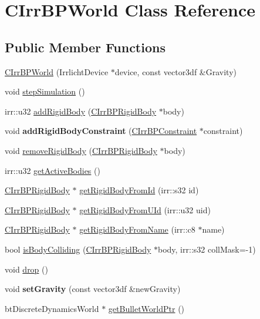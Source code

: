 \hypertarget{class_c_irr_b_p_world}{
\section{CIrrBPWorld Class Reference}
\label{class_c_irr_b_p_world}
}
\subsection*{Public Member Functions}
\begin{DoxyCompactItemize}
\item 
\hyperlink{class_c_irr_b_p_world_a585d92e41db74a19bf1cb982ddc0cddc}{CIrrBPWorld} (IrrlichtDevice $\ast$device, const vector3df \&Gravity)
\item 
void \hyperlink{class_c_irr_b_p_world_aa676e88466f927af2ac0c4c8cd94e0f3}{stepSimulation} ()
\item 
irr::u32 \hyperlink{class_c_irr_b_p_world_a0bf527c522426b50d959ab5adc27be4c}{addRigidBody} (\hyperlink{class_c_irr_b_p_rigid_body}{CIrrBPRigidBody} $\ast$body)
\item 
\hypertarget{class_c_irr_b_p_world_a7565f787e92f3c3cf76da072fe175b11}{
void {\bfseries addRigidBodyConstraint} (\hyperlink{class_c_irr_b_p_constraint}{CIrrBPConstraint} $\ast$constraint)}
\label{class_c_irr_b_p_world_a7565f787e92f3c3cf76da072fe175b11}

\item 
void \hyperlink{class_c_irr_b_p_world_a7133c6b9763ac425ac579cdfbda8788b}{removeRigidBody} (\hyperlink{class_c_irr_b_p_rigid_body}{CIrrBPRigidBody} $\ast$body)
\item 
irr::u32 \hyperlink{class_c_irr_b_p_world_a66e4c4aeef5d3ae6f907753860b8fd5a}{getActiveBodies} ()
\item 
\hyperlink{class_c_irr_b_p_rigid_body}{CIrrBPRigidBody} $\ast$ \hyperlink{class_c_irr_b_p_world_a7ebeb8e75b825a493daa1cea6d07aa21}{getRigidBodyFromId} (irr::s32 id)
\item 
\hyperlink{class_c_irr_b_p_rigid_body}{CIrrBPRigidBody} $\ast$ \hyperlink{class_c_irr_b_p_world_a1b96effdaad31a6e05185f2b683a0445}{getRigidBodyFromUId} (irr::u32 uid)
\item 
\hyperlink{class_c_irr_b_p_rigid_body}{CIrrBPRigidBody} $\ast$ \hyperlink{class_c_irr_b_p_world_a1ed94585fa44f0ab99cfa4a1fdc29fcd}{getRigidBodyFromName} (irr::c8 $\ast$name)
\item 
bool \hyperlink{class_c_irr_b_p_world_abc8fc2e0dbc203106e91cb1e944c496a}{isBodyColliding} (\hyperlink{class_c_irr_b_p_rigid_body}{CIrrBPRigidBody} $\ast$body, irr::s32 collMask=-\/1)
\item 
void \hyperlink{class_c_irr_b_p_world_a7cd82f40cde955cb54c1fc0268691be6}{drop} ()
\item 
\hypertarget{class_c_irr_b_p_world_a96e06a9d2b64d474bfd5325d2ffe809e}{
void {\bfseries setGravity} (const vector3df \&newGravity)}
\label{class_c_irr_b_p_world_a96e06a9d2b64d474bfd5325d2ffe809e}

\item 
btDiscreteDynamicsWorld $\ast$ \hyperlink{class_c_irr_b_p_world_aa9b3e5a74f8ee1185247bc58ec6aec0c}{getBulletWorldPtr} ()
\end{DoxyCompactItemize}
